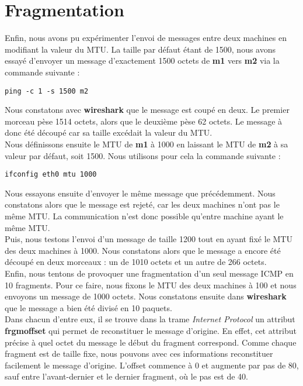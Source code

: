 \documentclass{article}
\begin{document}
\newpage

\section{Fragmentation}

Enfin, nous avons pu expérimenter l'envoi de messages entre deux machines en modifiant la valeur du MTU. La taille par défaut étant de 1500, nous avons essayé d'envoyer un message d'exactement 1500 octets de \textbf{m1} vers \textbf{m2} via la commande suivante :
\begin{verbatim}
ping -c 1 -s 1500 m2
\end{verbatim}

Nous constatons avec \textbf{wireshark} que le message est coupé en deux. Le premier morceau pèse 1514 octets, alors que le deuxième pèse 62 octets. Le message à donc été découpé car sa taille excédait la valeur du MTU. \\

Nous définissons ensuite le MTU de \textbf{m1} à 1000 en laissant le MTU de \textbf{m2} à sa valeur par défaut, soit 1500. Nous utilisons pour cela la commande suivante :
\begin{verbatim}
ifconfig eth0 mtu 1000
\end{verbatim}
Nous essayons ensuite d'envoyer le même message que précédemment. Nous constatons alors que le message est rejeté, car les deux machines n'ont pas le même MTU. La communication n'est donc possible qu'entre machine ayant le même MTU. \\

Puis, nous testons l'envoi d'un message de taille 1200 tout en ayant fixé le MTU des deux machines à 1000. Nous constatons alors que le message a encore été découpé en deux morceaux : un de 1010 octets et un autre de 266 octets. \\

Enfin, nous tentons de provoquer une fragmentation d'un seul message ICMP en 10 fragments. Pour ce faire, nous fixons le MTU des deux machines à 100 et nous envoyons un message de 1000 octets. Nous constatons ensuite dans \textbf{wireshark} que le message a bien été divisé en 10 paquets. \\

Dans chacun d'entre eux, il se trouve dans la trame \textit{Internet Protocol} un attribut \textbf{frgmoffset} qui permet de reconstituer le message d'origine. En effet, cet attribut précise à quel octet du message le début du fragment correspond. Comme chaque fragment est de taille fixe, nous pouvons avec ces informations reconstituer facilement le message d'origine. L'offset commence à 0 et augmente par pas de 80, sauf entre l'avant-dernier et le dernier fragment, où le pas est de 40.
\end{document}
